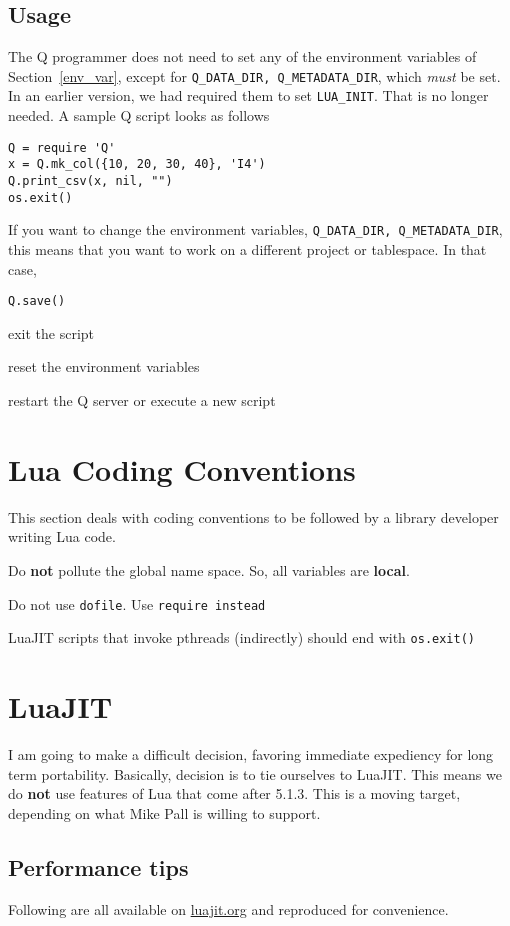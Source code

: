 \subsection{Usage}

The Q programmer does not need to set any of the environment variables of
Section~\ref{env_var}, except for 
\verb+Q_DATA_DIR, Q_METADATA_DIR+, which {\em must} be set. 
In an earlier version, we had required them
to set \verb+LUA_INIT+. That is no longer needed.
A sample Q script looks as follows
\begin{verbatim}
Q = require 'Q'
x = Q.mk_col({10, 20, 30, 40}, 'I4')
Q.print_csv(x, nil, "")
os.exit()
\end{verbatim}

If you want to change the environment variables, 
\verb+Q_DATA_DIR, Q_METADATA_DIR+, this means that you want to work on a
different project or tablespace. In that case, 
\be
\item \verb+Q.save()+
\item exit the script 
\item reset the environment variables
\item restart the Q server or execute a new script
\ee

\section{Lua Coding Conventions}
This section deals with coding conventions to be followed by a library developer
writing Lua code. 
\be
\item Do {\bf not} pollute the global name space. So, all variables are {\bf
local}.
\item Do not use {\tt dofile}. Use {\tt require instead}
\item LuaJIT scripts that invoke pthreads (indirectly) should end with
\verb+os.exit()+
\ee

\section{LuaJIT}
I am going to make a difficult decision, favoring immediate 
expediency for long term portability.  Basically, decision is to tie 
ourselves to LuaJIT. This means we do {\bf not}  use features of Lua that 
come after 5.1.3. This is a moving target, depending on what Mike Pall is
willing to support. 

\subsection{Performance tips}
Following are all available on \url{luajit.org} and reproduced for convenience. 


